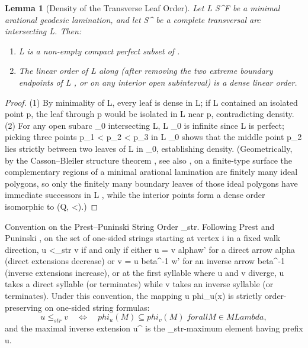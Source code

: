 \documentclass[11pt,a4paper,reqno]{amsart}
\def\({}%
\def\){}%
\def\mathcal#1{#1}%
\def\mathbb#1{#1}%
\def\mathrm#1{#1}%
\def\operatorname#1{#1}%
\def\text#1{#1}%
\def\forb{F}%
\def\Mod{M}%
\def\subset{\subseteq}%
\def\alpha{alpha}%
\def\beta{beta}%
\def\phi{phi}%
\def\Lambda{Lambda}%
\def\textbf#1{#1}%
\newtheorem{lemma}[theorem]{Lemma}
\theoremstyle{definition}
\theoremstyle{remark}
\newcommand{\Mod}[1]{\operatorname{Mod}(#1)}
\newcommand{\forb}{\mathfrak{F}}
\begin{document}
\begin{lemma}[Density of the Transverse Leaf Order]
\label{lem:leaf_density}
Let \(\mathcal{L} \subset \mathcal{S}^\circ \setminus \forb\) be a minimal arational geodesic lamination, and let \(\tau \subset \mathcal{S}^\circ\) be a complete transversal arc intersecting \(\mathcal{L}\). Then:
\begin{enumerate}
    \item \(\mathcal{L} \cap \tau\) is a non-empty compact perfect subset of \(\tau\).
    \item The linear order of \(\mathcal{L} \cap \tau\) along \(\tau\) (after removing the two extreme boundary endpoints of \(\mathcal{L} \cap \tau\), or on any interior open subinterval) is a dense linear order.
\end{enumerate}
\end{lemma}

\begin{proof}
(1) By minimality of \(\mathcal{L}\), every leaf is dense in \(\mathcal{L}\); if \(\mathcal{L} \cap \tau\) contained an isolated point \(p\), the leaf through \(p\) would be isolated in \(\mathcal{L}\) near \(p\), contradicting density. (2) For any open subarc \(\tau_0 \subset \tau\) intersecting \(\mathcal{L}\), \(\mathcal{L} \cap \tau_0\) is infinite since \(\mathcal{L} \cap \tau\) is perfect; picking three points \(p_1 < p_2 < p_3\) in \(\mathcal{L} \cap \tau_0\) shows that the middle point \(p_2\) lies strictly between two leaves of \(\mathcal{L}\) in \(\tau_0\), establishing density. (Geometrically, by the Casson--Bleiler structure theorem \cite[\S I.4.2]{CassonBleiler1988}, see also \cite[\S 4.1]{MjRafi2018}, on a finite-type surface the complementary regions of a minimal arational lamination are finitely many ideal polygons, so only the finitely many boundary leaves of those ideal polygons have immediate successors in \(\mathcal{L} \cap \tau\), while the interior points form a dense order isomorphic to \((\mathbb{Q}, <)\).)
\end{proof}

\noindent\textbf{Convention on the Prest--Puninski String Order \(\le_{\mathrm{str}}\).}
Following Prest and Puninski \cite[\S 2]{PrestPuninski2002}, on the set of one-sided strings starting at vertex \(i\) in a fixed walk direction, \(u <_{\mathrm{str}} v\) if and only if either \(u = v \alpha w'\) for a direct arrow \(\alpha\) (direct extensions decrease) or \(v = u \beta^{-1} w'\) for an inverse arrow \(\beta^{-1}\) (inverse extensions increase), or at the first syllable where \(u\) and \(v\) diverge, \(u\) takes a direct syllable (or terminates) while \(v\) takes an inverse syllable (or terminates). Under this convention, the mapping \(u \mapsto \phi_u(x)\) is strictly order-preserving on one-sided string formulas:
\[
u \le_{\mathrm{str}} v \quad \Longleftrightarrow \quad \phi_u(M) \subseteq \phi_v(M) \;\text{ for all } M \in \Mod{\Lambda},
\]
and the maximal inverse extension \(u^\uparrow\) is the \(\le_{\mathrm{str}}\)-maximum element having prefix \(u\).
\end{document}
